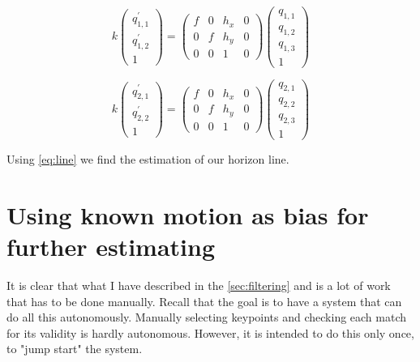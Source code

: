 \begin{equation}
    k\begin{pmatrix}
        q_{1, 1}^{'} \\ q_{1, 2}^{'} \\ 1
    \end{pmatrix} = 
    \begin{pmatrix}
        f & 0 & h_x & 0\\ 
        0 & f & h_y & 0\\ 
        0 & 0 & 1 & 0
    \end{pmatrix}
    \begin{pmatrix}
        q_{1,1} \\ q_{1,2} \\ q_{1,3} \\ 1
    \end{pmatrix}
\end{equation}

\begin{equation*}
    k\begin{pmatrix}
        q_{2, 1}^{'} \\ q_{2, 2}^{'} \\ 1
    \end{pmatrix} = 
    \begin{pmatrix}
        f & 0 & h_x & 0\\ 
        0 & f & h_y & 0\\ 
        0 & 0 & 1 & 0
    \end{pmatrix}
    \begin{pmatrix}
        q_{2,1} \\ q_{2,2} \\ q_{2,3} \\ 1
    \end{pmatrix}
\end{equation*}

Using \autoref{eq:line} we find the estimation of our horizon line.

\section{Using known motion as bias for further estimating}
It is clear that what I have described in the \autoref{sec:filtering} and \label{sec:matching} is a lot of work that has to be done manually. Recall that the goal is to have a system that can do all this autonomously. Manually selecting keypoints and checking each match for its validity is hardly autonomous. However, it is intended to do this only once, to "jump start" the system.\bigskip 

